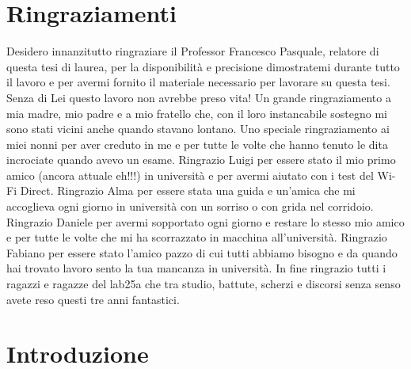 \chapter*{Ringraziamenti}


Desidero innanzitutto ringraziare il Professor
Francesco Pasquale, relatore di questa tesi di laurea,
per la disponibilità e precisione dimostratemi
durante tutto il lavoro e per
avermi fornito il materiale necessario
per lavorare su questa tesi.
Senza di Lei questo lavoro non avrebbe preso vita!
Un grande ringraziamento a mia madre, mio padre e a mio fratello che,
con il loro instancabile sostegno
mi sono stati vicini anche quando stavano lontano.
Uno speciale ringraziamento ai miei nonni per aver creduto in me e per tutte le volte che
hanno tenuto le dita incrociate quando avevo un esame. 
Ringrazio Luigi per essere stato il mio primo amico (ancora attuale eh!!!)
in università e per avermi aiutato con i test del Wi-Fi Direct.
Ringrazio Alma per essere stata una guida e un'amica che mi accoglieva ogni giorno
in università con
un sorriso o con grida nel corridoio.
Ringrazio Daniele per avermi sopportato ogni giorno e restare lo stesso mio amico
e per tutte le volte che mi ha scorrazzato in macchina all'università.
Ringrazio Fabiano per essere stato l'amico pazzo di cui tutti abbiamo bisogno
e da quando hai trovato lavoro sento la tua mancanza in università.
In fine ringrazio tutti i ragazzi e ragazze
del lab25a che tra studio, battute,
scherzi e discorsi senza senso avete reso questi tre anni fantastici.








\chapter*{Introduzione}


